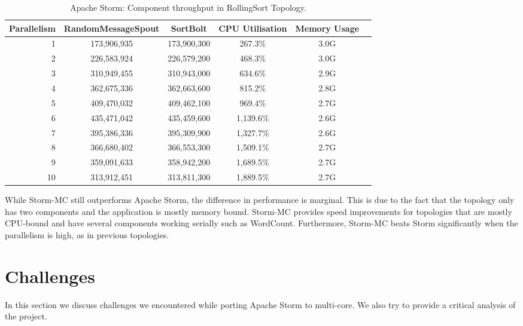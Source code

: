 \documentclass[bsc,logo,frontabs,twoside,singlespacing,normalheadings,parskip]{infthesis}\usepackage[]{graphicx}\usepackage[]{color}
\begin{document}
\begin{table}[!htb]
\begin{adjustwidth}{-0.5in}{-0.5in}
\centering
\small
\begin{tabular}{@{}rccccl@{}}
    \textbf{Parallelism} & \textbf{RandomMessageSpout} & \textbf{SortBolt} & \textbf{CPU Utilisation} & \textbf{Memory Usage} \\ \toprule
    1 & {173,906,935} & {173,900,300} & {267.3\%} & {3.0G} \\
    2 & {226,583,924} & {226,579,200} & {468.3\%} & {3.0G} \\
    3 & {310,949,455} & {310,943,000} & {634.6\%} & {2.9G} \\
    4 & {362,675,336} & {362,663,600} & {815.2\%} & {2.8G} \\
    5 & {409,470,032} & {409,462,100} & {969.4\%} & {2.7G} \\
    6 & {435,471,042} & {435,459,600} & {1,139.6\%} & {2.6G} \\
    7 & {395,386,336} & {395,309,900} & {1,327.7\%} & {2.6G} \\
    8 & {366,680,402} & {366,553,300} & {1,509.1\%} & {2.7G} \\
    9 & {359,091,633} & {358,942,200} & {1,689.5\%} & {2.7G} \\
    10 & {313,912,451} & {313,811,300} & {1,889.5\%} & {2.7G} \\
\end{tabular}
\caption{Apache Storm: Component throughput in RollingSort Topology.}
\label{table:storm_rolling}
\end{adjustwidth}
\end{table}

While Storm-MC still outperforms Apache Storm, the difference in performance is marginal. This is due to the fact that the topology only has two components and the application is mostly memory bound. Storm-MC provides speed improvements for topologies that are mostly CPU-bound and have several components working serially such as WordCount. Furthermore, Storm-MC beats Storm significantly when the parallelism is high, as in previous topologies.

\section{Challenges}
\label{sec:challenges}

In this section we discuss challenges we encountered while porting Apache Storm to multi-core. We also try to provide a critical analysis of the project.
\end{document}

